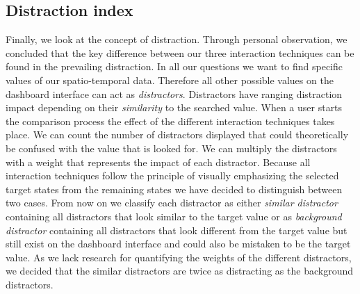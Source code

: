 \subsection{Distraction index}
Finally, we look at the concept of distraction. Through personal observation, we concluded that the key difference between our three interaction
techniques can be found in the prevailing distraction. In all our questions we want to find specific values of our spatio-temporal data. Therefore
all other possible values on the dashboard interface can act as \textit{distractors}. Distractors have ranging distraction impact depending on
their \textit{similarity} to the searched value. When a user starts the comparison process the effect of the different interaction techniques
takes place. We can count the number of distractors displayed that could theoretically be confused with the value that is looked for. We can
multiply the distractors with a weight that represents the impact of each distractor. Because all interaction techniques follow the principle
of visually emphasizing the selected target states from the remaining states we have decided to distinguish between two cases. From now on we classify
each distractor as either \textit{similar distractor} containing all distractors that look similar to the target value or as
\textit{background distractor} containing all distractors that look different from the target value but still exist on the dashboard
interface and could also be mistaken to be the target value. As we lack research for quantifying the weights of the different distractors, we
decided that the similar distractors are twice as distracting as the background distractors. 

